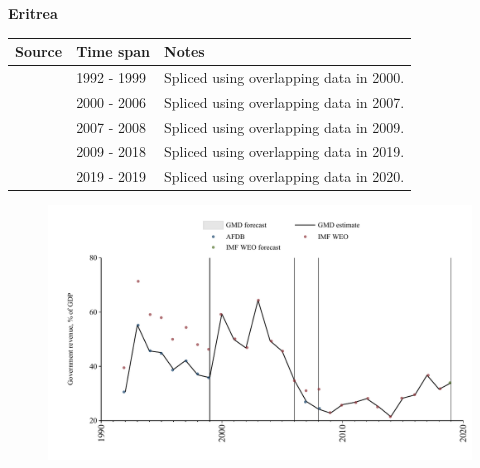 \documentclass[12pt,a4paper,landscape]{article}
\begin{document}
\begin{adjustbox}{max totalsize={\paperwidth}{\paperheight},center}
\begin{minipage}[t][\textheight][t]{\textwidth}
\vspace*{0.5cm}
{}
\begin{center}
{\Large\bfseries Eritrea}
\end{center}
\vspace{0.5cm}
\begin{table}[H]
\centering
\small
\begin{tabular}{|l|l|l|}
\hline
\textbf{Source} & \textbf{Time span} & \textbf{Notes} \\
\hline
\rowcolor{white}\cite{AFDB}& 1992 - 1999 &Spliced using overlapping data in 2000.\\
\rowcolor{lightgray}\cite{IMF_WEO}& 2000 - 2006 &Spliced using overlapping data in 2007.\\
\rowcolor{white}\cite{AFDB}& 2007 - 2008 &Spliced using overlapping data in 2009.\\
\rowcolor{lightgray}\cite{IMF_WEO}& 2009 - 2018 &Spliced using overlapping data in 2019.\\
\rowcolor{white}\cite{IMF_WEO_forecast}& 2019 - 2019 &Spliced using overlapping data in 2020.\\
\hline
\end{tabular}
\end{table}
\begin{figure}[H]
\centering
\includegraphics[width=\textwidth,height=0.6\textheight,keepaspectratio]{graphs/ERI_govrev_GDP.pdf}
\end{figure}
\end{minipage}
\end{adjustbox}
\end{document}
